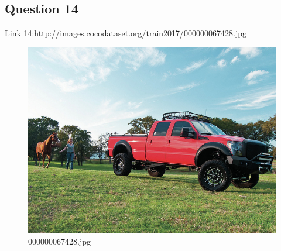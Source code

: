 \subsection*{Question 14}
Link 14:http://images.cocodataset.org/train2017/000000067428.jpg
    \begin{figure}[h]
        \centering
        \includegraphics[width=0.8\linewidth]{../image set/easy/000000067428.jpg}
        \caption{000000067428.jpg}
    \end{figure}
